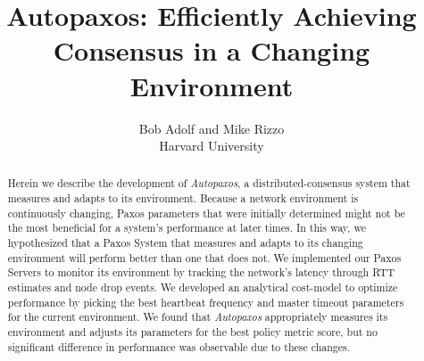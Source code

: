 \documentclass[pageno]{jpaper}
\title{Autopaxos: Efficiently Achieving Consensus in a Changing Environment}
\author{Bob Adolf and Mike Rizzo\\Harvard University}
\date{}
\begin{document}
\maketitle

\begin{abstract}
Herein we describe the development of \emph{Autopaxos}, a distributed-consensus system that measures and adapts to its environment.  Because a network environment is continuously changing, Paxos parameters that were initially determined might not be the most beneficial for a system's performance at later times.  In this way, we hypothesized that a Paxos System that measures and adapts to its changing environment will perform better than one that does not.  We implemented our Paxos Servers to monitor its environment by tracking the network's latency through RTT estimates and node drop events.  We developed an analytical cost-model to optimize performance by picking the best heartbeat frequency and master timeout parameters for the current environment.  We found that \emph{Autopaxos} appropriately measures its environment and adjusts its parameters for the best policy metric score, but no significant difference in performance was observable due to these changes.
\end{abstract}





%




\end{document}
